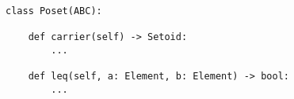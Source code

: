 \begin{verbatim}
class Poset(ABC):

    def carrier(self) -> Setoid:
        ...

    def leq(self, a: Element, b: Element) -> bool:
        ...
\end{verbatim}